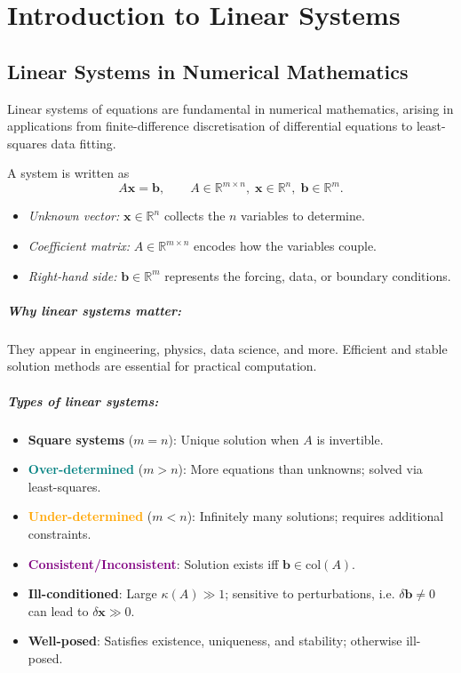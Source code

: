 \chapter{Introduction to Linear Systems}
\section{Linear Systems in Numerical Mathematics}

Linear systems of equations are fundamental in numerical mathematics, arising in applications from finite-difference discretisation of differential equations to least-squares data fitting.

A system is written as
\begin{equation}
    A\mathbf{x}=\mathbf{b}, \qquad A\in\mathbb{R}^{m\times n},\; \mathbf{x}\in\mathbb{R}^{n},\; \mathbf{b}\in\mathbb{R}^{m}.
\end{equation}

\begin{itemize}
    \item \emph{Unknown vector:} $\mathbf{x} \in \mathbb{R}^n$ collects the $n$ variables to determine.
    \item \emph{Coefficient matrix:} $A \in \mathbb{R}^{m \times n}$ encodes how the variables couple.
    \item \emph{Right-hand side:} $\mathbf{b} \in \mathbb{R}^m$ represents the forcing, data, or boundary conditions.
\end{itemize}

\paragraph{Why linear systems matter:}
They appear in engineering, physics, data science, and more. Efficient and stable solution methods are essential for practical computation.

\paragraph{Types of linear systems:}
\begin{itemize}
    \item \textbf{Square systems} ($m=n$): Unique solution when $A$ is invertible.
    \item \textbf{\textcolor{teal}{Over-determined}} ($m>n$): More equations than unknowns; solved via least-squares.
    \item \textbf{\textcolor{orange}{Under-determined}} ($m<n$): Infinitely many solutions; requires additional constraints.
    \item \textbf{\textcolor{purple}{Consistent/Inconsistent}}: Solution exists iff $\mathbf{b} \in \text{col}(A)$.
    \item \textbf{\textcolor{red!70!black}{Ill-conditioned}}: Large $\kappa(A) \gg 1$; sensitive to perturbations, i.e. $\delta\mathbf{b} \neq 0$ can lead to $\delta\mathbf{x} \gg 0$.
    \item \textbf{\textcolor{blue!70!black}{Well-posed}}: Satisfies existence, uniqueness, and stability; otherwise ill-posed.
\end{itemize}


